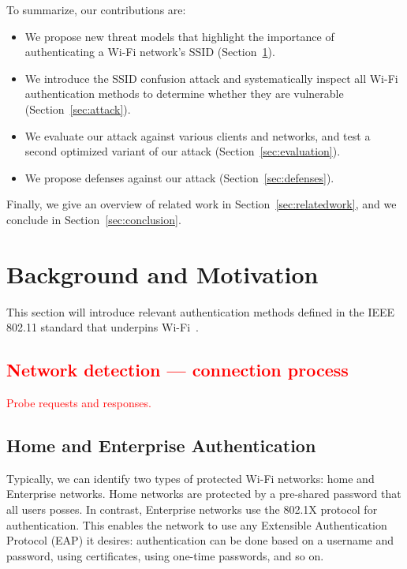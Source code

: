 \documentclass[sigconf,review]{acmart}
\newcommand{\wifi}{\mbox{Wi-Fi}}
\DeclareRobustCommand{\red}[1]{\textcolor{red}{#1}}
\begin{document}
To summarize, our contributions are:
\begin{itemize}
	\item We propose new threat models that highlight the importance of authenticating a \wifi{} network's SSID (Section~\ref{sec:motivation}).

    \item We introduce the SSID confusion attack and systematically inspect all \wifi{} authentication methods to determine whether they are vulnerable (Section~\ref{sec:attack}).

    \item
    We evaluate our attack against various clients and networks, and test a second optimized variant of our attack (Section~\ref{sec:evaluation}).
	
	\item We propose %
	defenses against our attack (Section~\ref{sec:defenses}).
\end{itemize}
Finally, we give an overview of related work in Section~\ref{sec:relatedwork}, and we conclude in Section~\ref{sec:conclusion}.


\section{Background and Motivation}
\label{sec:motivation}

This section will introduce relevant authentication methods defined in the IEEE 802.11 standard that underpins \wifi{}~\cite{ieee80211-2020}.

\subsection{\red{Network detection --- connection process}}

\red{Probe requests and responses.}

\subsection{Home and Enterprise Authentication}

Typically, we can identify two types of protected \wifi{} networks: home and Enterprise networks.
Home networks are protected by a pre-shared password that all users posses.
In contrast, Enterprise networks use the 802.1X protocol for authentication.
This enables the network to use any Extensible Authentication Protocol (EAP) it desires: authentication can be done based on a username and password, using certificates, using one-time passwords, and so on.
\end{document}
